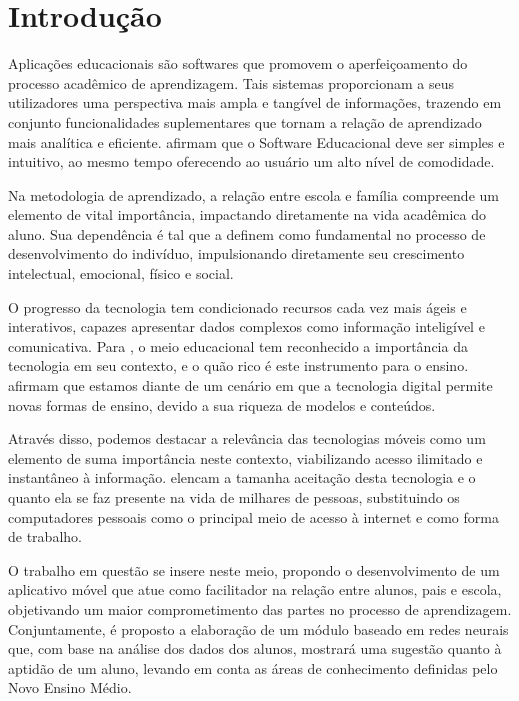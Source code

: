 

\setlength{\afterchapskip}{1.5cm minus \baselineskip}


\chapter{Introdução}
\label{cha:motivacao}
Aplicações educacionais são softwares que promovem o aperfeiçoamento do processo acadêmico de aprendizagem. Tais sistemas proporcionam a seus utilizadores uma perspectiva mais ampla e tangível de informações, trazendo em conjunto funcionalidades suplementares que tornam a relação de aprendizado mais analítica e eficiente.  afirmam que o Software Educacional deve ser simples e intuitivo, ao mesmo tempo oferecendo ao usuário um alto nível de comodidade.

Na metodologia de aprendizado, a relação entre escola e família compreende um elemento de vital importância, impactando diretamente na vida acadêmica do aluno. Sua dependência é tal que  a definem como fundamental no processo de desenvolvimento do indivíduo, impulsionando diretamente seu crescimento intelectual, emocional, físico e social.

O progresso da tecnologia tem condicionado recursos cada vez mais ágeis e interativos, capazes apresentar dados complexos como informação inteligível e comunicativa. Para , o meio educacional tem reconhecido a importância da tecnologia em seu contexto, e o quão rico é este instrumento para o ensino.  afirmam que estamos diante de um cenário em que a tecnologia digital permite novas formas de ensino, devido a sua riqueza de modelos e conteúdos.

Através disso, podemos destacar a relevância das tecnologias móveis como um elemento de suma importância neste contexto, viabilizando acesso ilimitado e instantâneo à informação.  elencam a tamanha aceitação desta tecnologia e o quanto ela se faz presente na vida de milhares de pessoas, substituindo os computadores pessoais como o principal meio de acesso à internet e como forma de trabalho.

O trabalho em questão se insere neste meio, propondo o desenvolvimento de um aplicativo móvel que atue como facilitador na relação entre alunos, pais e escola, objetivando um maior comprometimento das partes no processo de aprendizagem. Conjuntamente, é proposto a elaboração de um módulo baseado em redes neurais que, com base na análise dos dados dos alunos, mostrará uma sugestão quanto à aptidão de um aluno, levando em conta as áreas de conhecimento definidas pelo Novo Ensino Médio.

